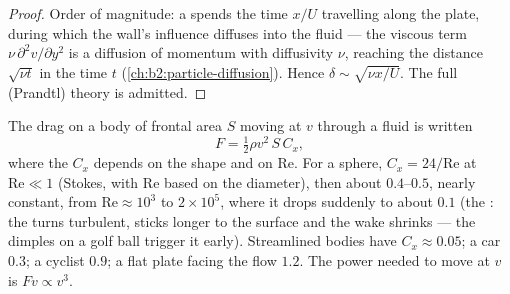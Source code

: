 \begin{proof}
Order of magnitude: a  spends the time $x/U$ travelling
along the plate, during which the wall's influence diffuses into the
fluid --- the viscous term $\nu\,\partial^2v/\partial y^2$ is a diffusion of
momentum with diffusivity $\nu$, reaching the distance $\sqrt{\nu t}$ in
the time $t$ (\cref{ch:b2:particle-diffusion}). Hence $\delta \sim \sqrt{\nu x
/U}$. The full (Prandtl) theory is admitted.
\end{proof}

\begin{proposition}\label{prop:b2:viscous-flows:drag}
The drag on a body of frontal area $S$ moving at $v$ through a fluid is
written
\[
F = \tfrac12\rho v^2\,S\,C_x ,
\]
where the \emph{} $C_x$ depends on the shape and on
$\mathrm{Re}$. For a sphere, $C_x = 24/\mathrm{Re}$ at $\mathrm{Re} \ll 1$ (Stokes,
with $\mathrm{Re}$ based on the diameter), then about $0.4$--$0.5$, nearly
constant, from $\mathrm{Re} \approx 10^3$ to $2 \times 10^5$, where it drops
suddenly to about $0.1$ (the \emph{}: the  turns
turbulent, sticks longer to the surface and the wake shrinks --- the
dimples on a golf ball trigger it early). Streamlined bodies have
$C_x \approx 0.05$; a car $0.3$; a cyclist $0.9$; a flat plate facing the flow
$1.2$. The power needed to move at $v$ is $Fv \propto v^3$.
\end{proposition}
\admitted


